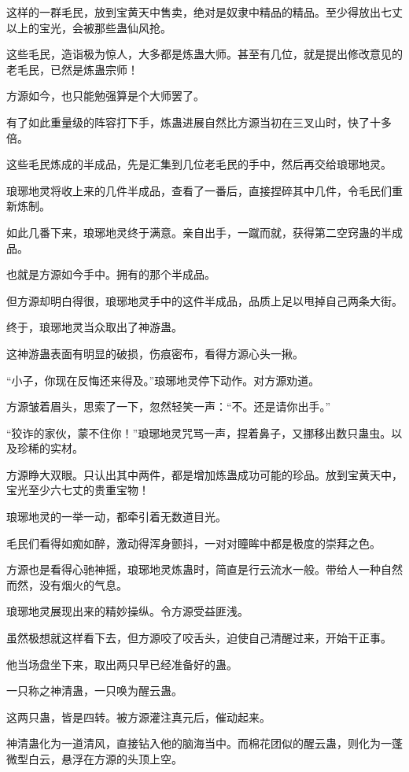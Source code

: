 \begin{this_body}
这样的一群毛民，放到宝黄天中售卖，绝对是奴隶中精品的精品。至少得放出七丈以上的宝光，会被那些蛊仙风抢。

这些毛民，造诣极为惊人，大多都是炼蛊大师。甚至有几位，就是提出修改意见的老毛民，已然是炼蛊宗师！

方源如今，也只能勉强算是个大师罢了。

有了如此重量级的阵容打下手，炼蛊进展自然比方源当初在三叉山时，快了十多倍。

这些毛民炼成的半成品，先是汇集到几位老毛民的手中，然后再交给琅琊地灵。

琅琊地灵将收上来的几件半成品，查看了一番后，直接捏碎其中几件，令毛民们重新炼制。

如此几番下来，琅琊地灵终于满意。亲自出手，一蹴而就，获得第二空窍蛊的半成品。

也就是方源如今手中。拥有的那个半成品。

但方源却明白得很，琅琊地灵手中的这件半成品，品质上足以甩掉自己两条大街。

终于，琅琊地灵当众取出了神游蛊。

这神游蛊表面有明显的破损，伤痕密布，看得方源心头一揪。

“小子，你现在反悔还来得及。”琅琊地灵停下动作。对方源劝道。

方源皱着眉头，思索了一下，忽然轻笑一声：“不。还是请你出手。”

“狡诈的家伙，蒙不住你！”琅琊地灵咒骂一声，捏着鼻子，又挪移出数只蛊虫。以及珍稀的实材。

方源睁大双眼。只认出其中两件，都是增加炼蛊成功可能的珍品。放到宝黄天中，宝光至少六七丈的贵重宝物！

琅琊地灵的一举一动，都牵引着无数道目光。

毛民们看得如痴如醉，激动得浑身颤抖，一对对瞳眸中都是极度的崇拜之色。

方源也是看得心驰神摇，琅琊地灵炼蛊时，简直是行云流水一般。带给人一种自然而然，没有烟火的气息。

琅琊地灵展现出来的精妙操纵。令方源受益匪浅。

虽然极想就这样看下去，但方源咬了咬舌头，迫使自己清醒过来，开始干正事。

他当场盘坐下来，取出两只早已经准备好的蛊。

一只称之神清蛊，一只唤为醒云蛊。

这两只蛊，皆是四转。被方源灌注真元后，催动起来。

神清蛊化为一道清风，直接钻入他的脑海当中。而棉花团似的醒云蛊，则化为一蓬微型白云，悬浮在方源的头顶上空。


\end{this_body}
